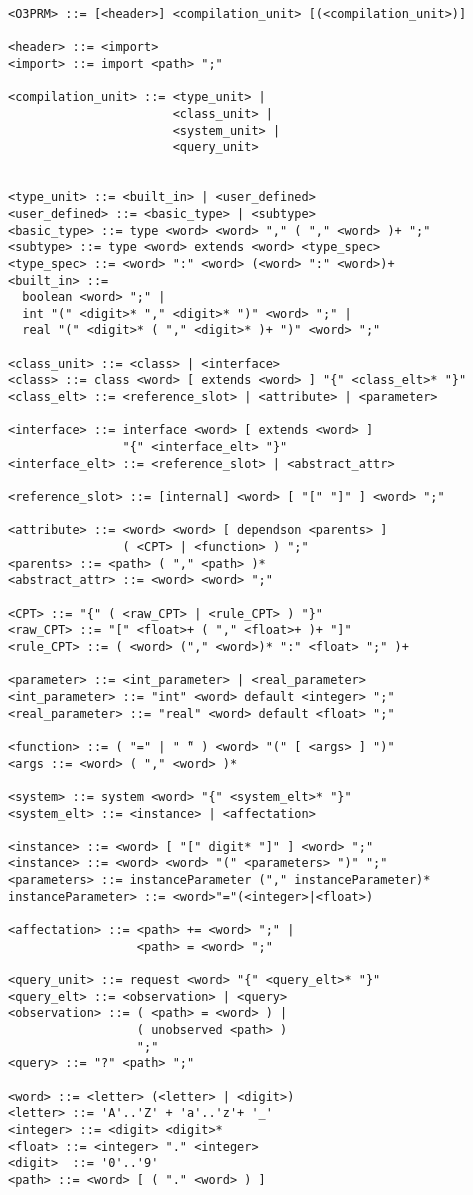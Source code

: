 \documentclass[singlespacing,12pt,a4paper]{article}
\begin{document}
\begin{footnotesize}
\begin{verbatim}
<O3PRM> ::= [<header>] <compilation_unit> [(<compilation_unit>)]

<header> ::= <import>
<import> ::= import <path> ";"

<compilation_unit> ::= <type_unit> |
                       <class_unit> |
                       <system_unit> |
                       <query_unit>


<type_unit> ::= <built_in> | <user_defined>
<user_defined> ::= <basic_type> | <subtype>
<basic_type> ::= type <word> <word> "," ( "," <word> )+ ";"
<subtype> ::= type <word> extends <word> <type_spec>
<type_spec> ::= <word> ":" <word> (<word> ":" <word>)+
<built_in> ::=
  boolean <word> ";" |
  int "(" <digit>* "," <digit>* ")" <word> ";" |
  real "(" <digit>* ( "," <digit>* )+ ")" <word> ";"

<class_unit> ::= <class> | <interface>
<class> ::= class <word> [ extends <word> ] "{" <class_elt>* "}"
<class_elt> ::= <reference_slot> | <attribute> | <parameter>

<interface> ::= interface <word> [ extends <word> ]
                "{" <interface_elt> "}"
<interface_elt> ::= <reference_slot> | <abstract_attr>

<reference_slot> ::= [internal] <word> [ "[" "]" ] <word> ";"

<attribute> ::= <word> <word> [ dependson <parents> ]
                ( <CPT> | <function> ) ";"
<parents> ::= <path> ( "," <path> )*
<abstract_attr> ::= <word> <word> ";"

<CPT> ::= "{" ( <raw_CPT> | <rule_CPT> ) "}"
<raw_CPT> ::= "[" <float>+ ( "," <float>+ )+ "]"
<rule_CPT> ::= ( <word> ("," <word>)* ":" <float> ";" )+

<parameter> ::= <int_parameter> | <real_parameter>
<int_parameter> ::= "int" <word> default <integer> ";"
<real_parameter> ::= "real" <word> default <float> ";"

<function> ::= ( "=" | " ̃" ) <word> "(" [ <args> ] ")"
<args ::= <word> ( "," <word> )*

<system> ::= system <word> "{" <system_elt>* "}"
<system_elt> ::= <instance> | <affectation>

<instance> ::= <word> [ "[" digit* "]" ] <word> ";"
<instance> ::= <word> <word> "(" <parameters> ")" ";"
<parameters> ::= instanceParameter ("," instanceParameter)*
instanceParameter> ::= <word>"="(<integer>|<float>)

<affectation> ::= <path> += <word> ";" |
                  <path> = <word> ";"

<query_unit> ::= request <word> "{" <query_elt>* "}"
<query_elt> ::= <observation> | <query>
<observation> ::= ( <path> = <word> ) |
                  ( unobserved <path> )
                  ";"
<query> ::= "?" <path> ";"

<word> ::= <letter> (<letter> | <digit>)
<letter> ::= 'A'..'Z' + 'a'..'z'+ '_'
<integer> ::= <digit> <digit>*
<float> ::= <integer> "." <integer>
<digit>  ::= '0'..'9'
<path> ::= <word> [ ( "." <word> ) ]

\end{verbatim}
\end{footnotesize}
\end{document}

